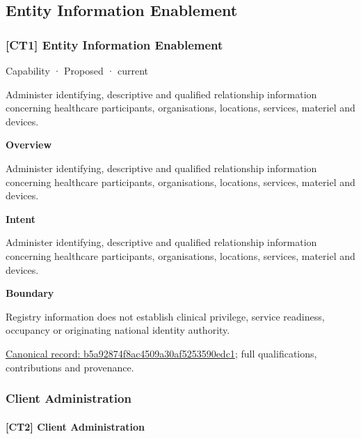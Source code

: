 \subsection{Entity Information Enablement}

\subsubsection{[CT1] Entity Information Enablement}

\label{element:b5a92874f8ac4509a30af5253590edc1}
{\small Capability · Proposed · current}\par

Administer identifying, descriptive and qualified relationship information concerning healthcare participants, organisations, locations, services, materiel and devices.



\textbf{Overview}



Administer identifying, descriptive and qualified relationship information concerning healthcare participants, organisations, locations, services, materiel and devices.



\textbf{Intent}



Administer identifying, descriptive and qualified relationship information concerning healthcare participants, organisations, locations, services, materiel and devices.



\textbf{Boundary}



Registry information does not establish clinical privilege, service readiness, occupancy or originating national identity authority.


{\footnotesize \href{../../../../continuum/strategy/capability/b5a92874f8ac4509a30af5253590edc1.md}{Canonical record: b5a92874f8ac4509a30af5253590edc1}; full qualifications, contributions and provenance.}\par
\subsubsection{Client Administration}

\paragraph{[CT2] Client Administration}

